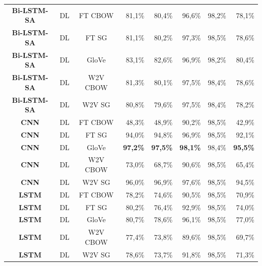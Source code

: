 \begin{table}[htb]
\begin{tabular}{@{}cccrrrrr@{}}
\textbf{Bi-LSTM-SA} & \gls{DL}& FT CBOW & 81,1\% & 80,4\% & 96,6\% & 98,2\% & 78,1\% \\
\textbf{Bi-LSTM-SA} & \gls{DL} & FT \gls{SG} & 81,1\% & 80,2\% & 97,3\% & 98,5\% & 78,6\% \\
\textbf{Bi-LSTM-SA}  & \gls{DL} & GloVe & 83,1\% & 82,6\% & 96,9\% & 98,2\% & 80,4\% \\
\textbf{Bi-LSTM-SA} & \gls{DL}  & W2V CBOW & 81,3\% & 80,1\% & 97,5\% & 98,4\% & 78,6\% \\
\textbf{Bi-LSTM-SA}  & \gls{DL} & W2V \gls{SG} & 80,8\% & 79,6\% & 97,5\% & 98,4\% & 78,2\% \\
\textbf{\gls{CNN}} & \gls{DL}  & FT CBOW & 48,3\% & 48,9\% & 90,2\% & 98,5\% & 42,9\% \\
\textbf{\gls{CNN}} & \gls{DL}  & FT \gls{SG} & 94,0\% & 94,8\% & 96,9\% & 98,5\% & 92,1\% \\
\textbf{\gls{CNN}}  & \gls{DL} & GloVe & \textbf{97,2\%} & \textbf{97,5\%} & \textbf{98,1\%} & 98,4\% & \textbf{95,5\%} \\
\textbf{\gls{CNN}}  & \gls{DL} & W2V CBOW & 73,0\% & 68,7\% & 90,6\% & 98,5\% & 65,4\% \\
\textbf{\gls{CNN}} & \gls{DL}  & W2V \gls{SG} & 96,0\% & 96,9\% & 97,6\% & 98,5\% & 94,5\% \\
\textbf{\gls{LSTM}} & \gls{DL}  & FT CBOW & 78,2\% & 74,6\% & 90,5\% & 98,5\% & 70,9\% \\
\textbf{\gls{LSTM}}  & \gls{DL} & FT \gls{SG} & 80,2\% & 76,4\% & 92,9\% & 98,5\% & 74,0\% \\
\textbf{\gls{LSTM}} & \gls{DL}  & GloVe & 80,7\% & 78,6\% & 96,1\% & 98,5\% & 77,0\% \\
\textbf{\gls{LSTM}}  & \gls{DL} & W2V CBOW & 77,4\% & 73,8\% & 89,6\% & 98,5\% & 69,7\% \\
\textbf{\gls{LSTM}} & \gls{DL}  & W2V \gls{SG} & 78,6\% & 73,7\% & 91,8\% & 98,5\% & 71,3\% \\ \bottomrule
\end{tabular}

\end{table}




